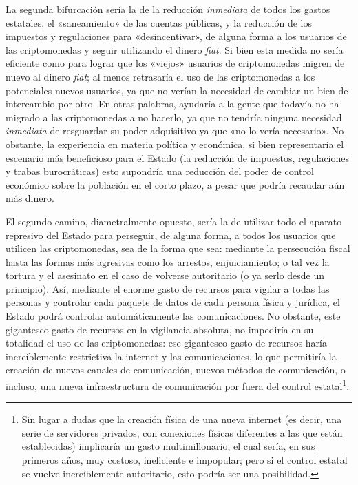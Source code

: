 \documentclass[12pt,a4paper,twoside]{book}
\begin{document}
La segunda bifurcación sería la de la reducción \textit{inmediata} de todos los gastos estatales, el «saneamiento» de las cuentas públicas, y la reducción de los impuestos y regulaciones para «desincentivar», de alguna forma a los usuarios de las criptomonedas y seguir utilizando el dinero \textit{fiat}. Si bien esta medida no sería eficiente como para lograr que los «viejos» usuarios de criptomonedas migren de nuevo al dinero \textit{fiat}; al menos retrasaría el uso de las criptomonedas a los potenciales nuevos usuarios, ya que no verían la necesidad de cambiar un bien de intercambio por otro. En otras palabras, ayudaría a la gente que todavía no ha migrado a las criptomonedas a no hacerlo, ya que no tendría ninguna necesidad \textit{inmediata} de resguardar su poder adquisitivo ya que «no lo vería necesario». No obstante, la experiencia en materia política y económica, si bien representaría el escenario más beneficioso para el Estado (la reducción de impuestos, regulaciones y trabas burocráticas) esto supondría una reducción del poder de control económico sobre la población en el corto plazo, a pesar que podría recaudar aún más dinero.

El segundo camino, diametralmente opuesto, sería la de utilizar todo el aparato represivo del Estado para perseguir, de alguna forma, a todos los usuarios que utilicen las criptomonedas, sea de la forma que sea: mediante la persecución fiscal hasta las formas más agresivas como los arrestos, enjuiciamiento; o tal vez la tortura y el asesinato en el caso de volverse autoritario (o ya serlo desde un principio). Así, mediante el enorme gasto de recursos para vigilar a todas las personas y controlar cada paquete de datos de cada persona física y jurídica, el Estado podrá controlar automáticamente las comunicaciones. No obstante, este gigantesco gasto de recursos en la vigilancia absoluta, no impediría en su totalidad el uso de las criptomonedas: ese gigantesco gasto de recursos haría increíblemente restrictiva la internet y las comunicaciones, lo que permitiría la creación de nuevos canales de comunicación, nuevos métodos de comunicación, o incluso, una nueva infraestructura de comunicación por fuera del control estatal\footnote{Sin lugar a dudas que la creación física de una nueva internet (es decir, una serie de servidores privados, con conexiones físicas diferentes a las que están establecidas) implicaría un gasto multimillonario, el cual sería, en sus primeros años, muy costoso, ineficiente e impopular; pero si el control estatal se vuelve increíblemente autoritario, esto podría ser una posibilidad.}.
\end{document}
